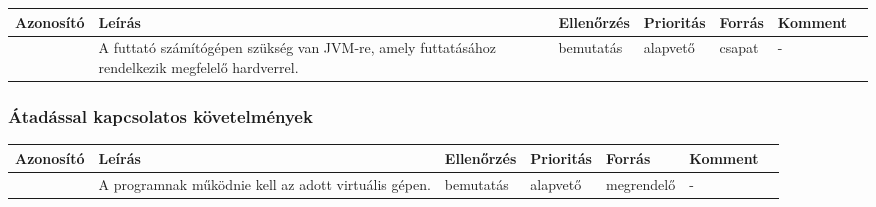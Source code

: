 \noindent\begin{tabularx}{\textwidth}{| l | X | l | l | l | l | l |}
	\hline
	\textbf{Azonosító}                                                                              &
	\textbf{Leírás}                                                                                 &
	\textbf{Ellenőrzés}                                                                             &
	\textbf{Prioritás}                                                                              &
	\textbf{Forrás}                                                                                 &
	\textbf{Komment}                                                                                  \\

	\hline
	\hline

	\azonosito                                                                                      &
	A futtató számítógépen szükség van JVM-re, amely futtatásához rendelkezik megfelelő hardverrel. &
	bemutatás                                                                                       &
	alapvető                                                                                        &
	csapat                                                                                          &
	-                                                                                                 \\

	\hline
\end{tabularx}

\subsubsection{Átadással kapcsolatos követelmények}

\noindent\begin{tabularx}{\textwidth}{| l | X | l | l | l | l | l |}
	\hline
	\textbf{Azonosító}                                   &
	\textbf{Leírás}                                      &
	\textbf{Ellenőrzés}                                  &
	\textbf{Prioritás}                                   &
	\textbf{Forrás}                                      &
	\textbf{Komment}                                       \\

	\hline
	\hline

	\azonosito                                           &
	A programnak működnie kell az adott virtuális gépen. &
	bemutatás                                            &
	alapvető                                             &
	megrendelő                                           &
	-                                                      \\

	\hline
\end{tabularx}

